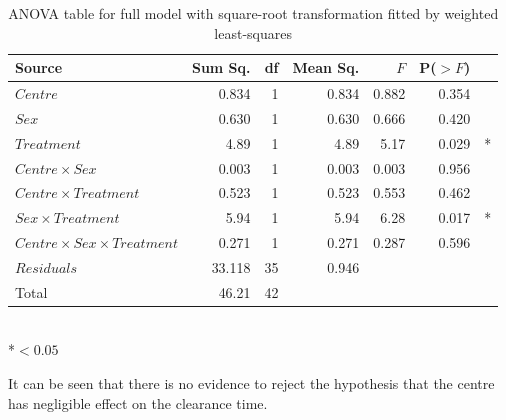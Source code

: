 \begin{table}[h]
\centering
\caption{ANOVA table for full model with square-root transformation fitted by weighted least-squares}\label{aovsqrtwt}
\begin{tabular}{l|rrrrrl}                   
Source&Sum Sq.&df&Mean Sq.&$F$&P($>F$)\\
\hline
$Centre$     &                0.834 &1&  0.834 & 0.882 & 0.354 &\\    
$Sex$        &               0.630 &1&  0.630 & 0.666 & 0.420 &\\  
$Treatment$  &            4.89 &1&  4.89 &  5.17 & 0.029& *\\
$Centre\times Sex$ &             0.003 &1& 0.003 & 0.003 & 0.956&\\
$Centre\times Treatment$ &        0.523 &1&  0.523 & 0.553 & 0.462&\\
$Sex\times Treatment$     &     5.94 &1& 5.94 & 6.28 & 0.017& *\\
$Centre\times Sex\times Treatment$ &   0.271 &1&  0.271 & 0.287 & 0.596&\\
$Residuals$      &    33.118 &35&  0.946 &&&\\
\hline
Total&46.21&42&&&
\end{tabular}\\
\hspace{20em}*$<0.05$
\end{table}

It can be seen that there is no evidence to reject the hypothesis that the centre has negligible effect on the clearance time. 

